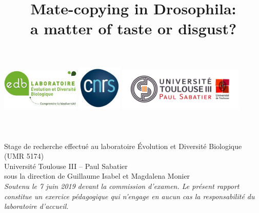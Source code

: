 \documentclass[a4paper, 12pt]{article}
\begin{document}
\title{Mate-copying in Drosophila:\\ a matter of taste or disgust?}		
  \makeatletter
    \begin{titlepage}
	         \begin{center}
		  \includegraphics[width=0.28\textwidth]{images/edb}\hspace{2em}
		 \includegraphics[width=0.16\textwidth]{images/cnrs}\hspace{0.5em}
		  \includegraphics[width=0.45\textwidth]{images/paulsab}\\
		             [3.6em]
		             {\Large
			                 \bfseries \@title }\\[2em]
		             {\large \@author}\\[1.2em]
		             {\large \@date}\\
		             \vspace{2.8 em}
		             {\normalsize
			             Stage de recherche effectué au laboratoire Évolution et 
			 Diversité Biologique (UMR 5174)\\
			             Université Toulouse III -- Paul Sabatier\\
			             sous la direction de Guillaume Isabel et Magdalena Monier}\\
		            \vspace{2.8 em}
 {\normalsize \emph{Soutenu le 7 juin 2019 devant la
		 commission d'examen. Le présent rapport constitue un exercice 
		 pédagogique qui n'engage en aucun cas la responsabilité du laboratoire 
		 d'accueil.}}
         \end{center}
     \end{titlepage}
     \makeatother
     \thispagestyle{empty}
     \newpage
\end{document}
